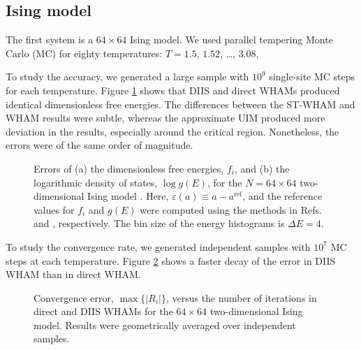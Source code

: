 \documentclass{gMOS2e}
\begin{document}
\subsection{\label{sec:results_Ising}
Ising model}





The first system is
a $64\times64$ Ising model.
%
We used parallel tempering\cite{
swendsen1986, geyer1991, hukushima1996, hansmann1997, earl2005}
Monte Carlo (MC)
for
eighty temperatures: $T = 1.5$, $1.52$, \dots, $3.08$,



To study the accuracy,
we generated a large sample with
$10^9$ single-site MC steps for each temperature.
%
Figure \ref{fig:is2ref} shows that
DIIS and direct WHAMs produced identical
dimensionless free energies.
%
The differences between the ST-WHAM and WHAM results
were subtle,
whereas the approximate UIM
produced more deviation in the results,
especially around the critical region.
%
Nonetheless,
the errors were of the same order of magnitude.



\begin{figure}[h]
\begin{center}
  \caption{
    \label{fig:is2ref}
    Errors of
    (a) the dimensionless free energies, $f_i$, and
    (b) the logarithmic density of states, $\log g(E)$,
    for the $N = 64\times64$ two-dimensional Ising model
    .
    Here,
    $\varepsilon(a) \equiv a - a^\mathrm{ref}$,
    and the reference values for $f_i$ and $g(E)$
    were computed using the methods in
    Refs. \cite{ferdinand1969} and \cite{beale1996},
    respectively.
    The bin size of the energy histograms is $\Delta E = 4$.
  }
\end{center}
\end{figure}




To study the convergence rate,
we generated independent samples with
$10^7$ MC steps at each temperature.
%
Figure \ref{fig:is2trace}
shows a faster decay of the error
in DIIS WHAM
than in direct WHAM.






\begin{figure}[h]
\begin{center}
  \caption{
    \label{fig:is2trace}
    Convergence error, $\max \{ |R_i| \}$,
    versus the number of iterations
    in direct and DIIS WHAMs
    for the $64\times64$ two-dimensional Ising model.
    Results were geometrically averaged over independent samples.
  }
\end{center}
\end{figure}
\end{document}

